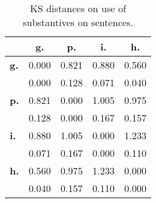 \begin{table}[h!]
\begin{center}
\begin{tabular}{| l || c | c | c | c |}\hline
 & {\bf g.} & {\bf p.} & {\bf i.} & {\bf h.} \\\hline\hline
{\bf g.} & 0.000 & 0.821 & 0.880 & 0.560 \\
{\bf } & 0.000 & 0.128 & 0.071 & 0.040 \\\hline
{\bf p.} & 0.821 & 0.000 & 1.005 & 0.975 \\
{\bf } & 0.128 & 0.000 & 0.167 & 0.157 \\\hline
{\bf i.} & 0.880 & 1.005 & 0.000 & 1.233 \\
{\bf } & 0.071 & 0.167 & 0.000 & 0.110 \\\hline
{\bf h.} & 0.560 & 0.975 & 1.233 & 0.000 \\
{\bf } & 0.040 & 0.157 & 0.110 & 0.000 \\\hline
\end{tabular}
\caption{KS distances on use of substantives on sentences.}
\end{center}
\end{table}